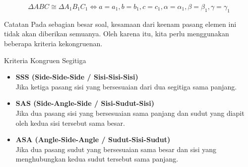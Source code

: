 ﻿\documentclass[aspectratio=169]{beamer}
\theoremstyle{definition}
\begin{document}
\begin{frame}{\insertsection}{\insertsubsection}
\begin{center}
  \end{center}
  \vspace*{-0.4cm}
  \[\boxed{\Delta ABC \cong \Delta A_1B_1C_1 \iff a = a_1, b = b_1, c = c_1, \alpha = \alpha_1, \beta = \beta_1, \gamma = \gamma_1}\]
\end{frame}
\begin{frame}{\insertsection}{\insertsubsection}
  \begin{alertblock}{Catatan}
    Pada sebagian besar soal, kesamaan dari keenam pasang elemen ini tidak akan diberikan semuanya. Oleh karena itu, kita perlu menggunakan beberapa kriteria kekongruenan.
  \end{alertblock}
  \begin{block}{Kriteria Kongruen Segitiga}
    \begin{itemize}
      \item \textbf{SSS (Side-Side-Side / Sisi-Sisi-Sisi)} \\
            Jika ketiga pasang sisi yang bersesuaian dari dua segitiga sama panjang.

      \item \textbf{SAS (Side-Angle-Side / Sisi-Sudut-Sisi)} \\
            Jika dua pasang sisi yang bersesuaian sama panjang dan sudut yang diapit oleh kedua sisi tersebut sama besar.

      \item \textbf{ASA (Angle-Side-Angle / Sudut-Sisi-Sudut)} \\
            Jika dua pasang sudut yang bersesuaian sama besar dan sisi yang menghubungkan kedua sudut tersebut sama panjang.
    \end{itemize}
  \end{block}
\end{frame}
\end{document}
